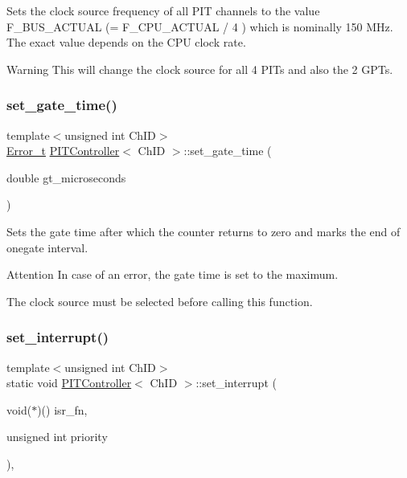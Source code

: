 Sets the clock source frequency of all P\+IT channels to the value F\+\_\+\+B\+U\+S\+\_\+\+A\+C\+T\+U\+AL (= F\+\_\+\+C\+P\+U\+\_\+\+A\+C\+T\+U\+AL / 4 ) which is nominally 150 M\+Hz. The exact value depends on the C\+PU clock rate. 

\begin{DoxyWarning}{Warning}
This will change the clock source for all 4 P\+I\+Ts and also the 2 G\+P\+Ts. 
\end{DoxyWarning}
\mbox{\label{classPITController_aaf7a79129a4ea5af057ea8f537b7ae9f}} 
\subsubsection{\texorpdfstring{set\+\_\+gate\+\_\+time()}{set\_gate\_time()}}
{\footnotesize\ttfamily template$<$unsigned int Ch\+ID$>$ \\
\hyperlink{errors_8hpp_a4e8c0d09726859e3d3369c0da5a1aa7f}{Error\+\_\+t} \hyperlink{classPITController}{P\+I\+T\+Controller}$<$ Ch\+ID $>$\+::set\+\_\+gate\+\_\+time (\begin{DoxyParamCaption}\item[{double}]{gt\+\_\+microseconds }\end{DoxyParamCaption})\hspace{0.3cm}{\ttfamily [inline]}}



Sets the gate time after which the counter returns to zero and marks the end of onegate interval. 

\begin{DoxyAttention}{Attention}
In case of an error, the gate time is set to the maximum. 

The clock source must be selected before calling this function. 
\end{DoxyAttention}
\mbox{\label{classPITController_aa94b6dc081d453c8dda54c3ade4b3d94}} 
\subsubsection{\texorpdfstring{set\+\_\+interrupt()}{set\_interrupt()}}
{\footnotesize\ttfamily template$<$unsigned int Ch\+ID$>$ \\
static void \hyperlink{classPITController}{P\+I\+T\+Controller}$<$ Ch\+ID $>$\+::set\+\_\+interrupt (\begin{DoxyParamCaption}\item[{void($\ast$)()}]{isr\+\_\+fn,  }\item[{unsigned int}]{priority }\end{DoxyParamCaption})\hspace{0.3cm}{\ttfamily [inline]}, {\ttfamily [static]}}



